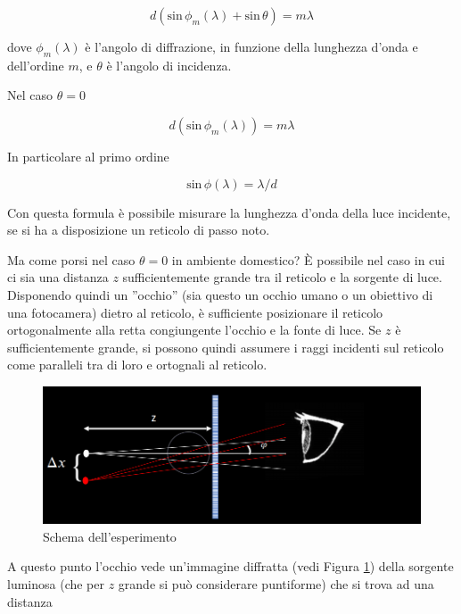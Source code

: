 \documentclass{article}
\begin{document}
\begin{equation}
d(\textrm{sin} \, \phi_m (\lambda) + \textrm{sin} \, \theta) = m\lambda
\end{equation}

dove $\phi _m (\lambda)$ è l'angolo di diffrazione, in funzione della lunghezza d'onda e dell'ordine $m$, e $\theta$ è l'angolo di incidenza.

Nel caso $\theta = 0$

\begin{equation}
d(\textrm{sin} \, \phi_m (\lambda)) = m\lambda
\end{equation}

In particolare al primo ordine

\begin{equation}
\textrm{sin} \, \phi (\lambda) = \lambda/d
\end{equation}

Con questa formula è possibile misurare la lunghezza d'onda della luce incidente, se si ha a disposizione un reticolo di passo noto.

\vspace{5mm}

Ma come porsi nel caso $\theta = 0$ in ambiente domestico? È possibile nel caso in cui ci sia una distanza $z$ sufficientemente grande tra il reticolo e la sorgente di luce. Disponendo quindi un ''occhio'' (sia questo un occhio umano o un obiettivo di una fotocamera) dietro al reticolo, è sufficiente posizionare il reticolo ortogonalmente alla retta congiungente l'occhio e la fonte di luce. Se $z$ è sufficientemente grande, si possono quindi assumere i raggi incidenti sul reticolo come paralleli tra di loro e ortognali al reticolo.

\begin{figure}[h!]
  \centering
  \includegraphics[width=0.8\linewidth]{IM_schema_1}
  \caption{Schema dell'esperimento}
  \label{schema}
\end{figure}

A questo punto l'occhio vede un'immagine diffratta (vedi Figura \ref{schema}) della sorgente luminosa (che per $z$ grande si può considerare puntiforme) che si trova ad una distanza 
\end{document}
